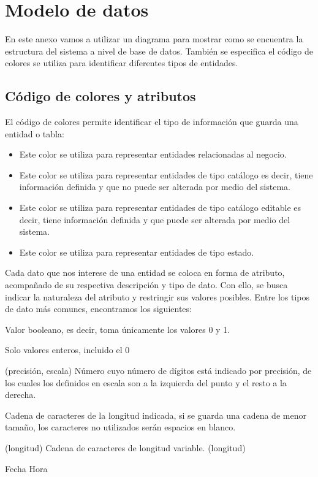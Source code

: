 \chapter{Modelo de datos}
En este anexo vamos a utilizar un diagrama para mostrar como se encuentra la estructura del sistema a nivel de base de datos. 
También se especifica el código de colores se utiliza para identificar diferentes tipos de entidades.

\section{Código de colores y atributos}

El código de colores permite identificar el tipo de información que guarda una entidad o tabla:


\begin{itemize}
    \item \IUEntidaB{} Este color se utiliza para representar entidades relacionadas al negocio.
    \item \IUEntidaA{} Este color se utiliza para representar entidades de tipo catálogo es decir, tiene información definida 
    y que no puede ser alterada por medio del sistema.
    \item \IUEntidaC{} Este color se utiliza para representar entidades de tipo catálogo editable es decir, tiene información definida 
    y que puede ser alterada por medio del sistema.
    \item \IUEntidaD{} Este color se utiliza para representar entidades de tipo estado.
\end{itemize}

Cada dato que nos interese de una entidad se coloca en forma de atributo, acompañado de su respectiva descripción y tipo de dato. Con ello, se busca indicar la naturaleza del atributo y restringir sus valores posibles. Entre los tipos de dato más comunes, encontramos los siguientes:

    \begin{bGlosario}
	    Valor booleano, es decir, toma únicamente los valores 0 y 1.

            Solo valores enteros, incluido el 0
            
         (precisión, escala)
            Número cuyo número de dígitos está indicado por precisión, de los cuales
            los definidos en escala son a la izquierda del punto y el resto a la derecha.
            
            Cadena de caracteres de la longitud indicada, si se guarda una cadena de menor
            tamaño, los caracteres no utilizados serán espacios en blanco.
            
         (longitud)
            Cadena de caracteres de longitud variable. 
         (longitud)
            
         Fecha
         Hora
    \end{bGlosario}

